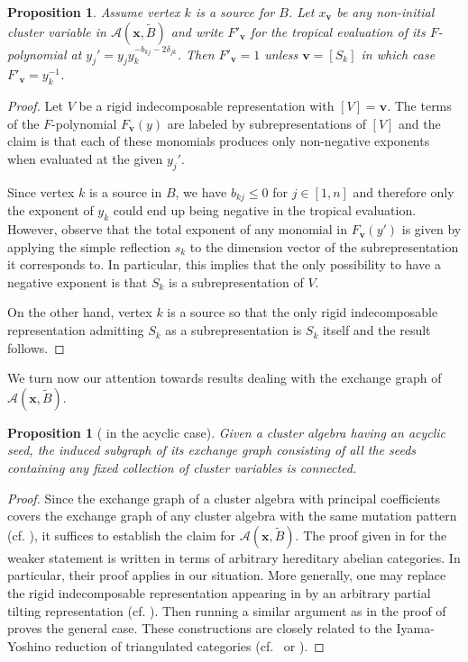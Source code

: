 \documentclass[12pt]{amsart}
\newtheorem{proposition}[theorem]{Proposition}
\newcommand{\bfv}{\mathbf{v}}
\newcommand{\bfx}{\mathbf{x}}
\newcommand{\cA}{\mathcal{A}}
\begin{document}
  \begin{proposition}
    \label{prop:principal F-polynomials}
    Assume vertex $k$ is a source for $B$.
    Let $x_\bfv$ be any non-initial cluster variable in $\cA(\bfx,\widetilde{B})$ and write $F'_\bfv$ for the tropical evaluation of its $F$-polynomial at $y_j'=y_jy_k^{-b_{kj}-2\delta_{jk}}$.
    Then $F'_\bfv=1$ unless $\bfv=[S_k]$ in which case $F'_\bfv=y_k^{-1}$.
  \end{proposition}
  \begin{proof}
    Let $V$ be a rigid indecomposable representation with $[V]=\bfv$.
    The terms of the $F$-polynomial $F_\bfv(y)$ are labeled by subrepresentations of $[V]$ and the claim is that each of these monomials produces only non-negative exponents when evaluated at the given $y_j'$.

    Since vertex $k$ is a source in $B$, we have $b_{kj}\leq 0$ for $j\in[1,n]$ and therefore only the exponent of $y_k$ could end up being negative in the tropical evaluation.
    However, observe that the total exponent of any monomial in $F_\bfv(y')$ is given by applying the simple reflection $s_k$ to the dimension vector of the subrepresentation it corresponds to.
    In particular, this implies that the only possibility to have a negative exponent is that $S_k$ is a subrepresentation of $V$.

    On the other hand, vertex $k$ is a source so that the only rigid indecomposable representation admitting $S_k$ as a subrepresentation is $S_k$ itself and the result follows.
  \end{proof}

  We turn now our attention towards results dealing with the exchange graph of $\cA(\bfx,\widetilde{B})$.

  \begin{proposition}[{\cite[Conjecture 3.10]{reading-speyer}} in the acyclic case]
    Given a cluster algebra having an acyclic seed, the induced subgraph of its exchange graph consisting of all the seeds containing any fixed collection of cluster variables is connected.
  \end{proposition}
  \begin{proof}
    Since the exchange graph of a cluster algebra with principal coefficients covers the exchange graph of any cluster algebra with the same mutation pattern (cf. \cite{fomin-zelevinsky4}), it suffices to establish the claim for $\cA(\bfx,\widetilde{B})$.
    The proof given in \cite[Corollary 3]{caldero-keller2} for the weaker statement \cite[Conjecture 4.14(3)]{FZ03} is written in terms of arbitrary hereditary abelian categories.
    In particular, their proof applies in our situation.
    More generally, one may replace the rigid indecomposable representation appearing in \cite[Section 5.4]{caldero-keller2} by an arbitrary partial tilting representation (cf. \cite[Proposition 3]{happel-rickard-schofield}).
    Then running a similar argument as in the proof of \cite[Theorem 6]{caldero-keller2} proves the general case.
    These constructions are closely related to the Iyama-Yoshino reduction of triangulated categories (cf.~\cite[Section 4]{iyama-yoshino} or \cite[Section 7.2]{keller}).
  \end{proof}
\end{document}
